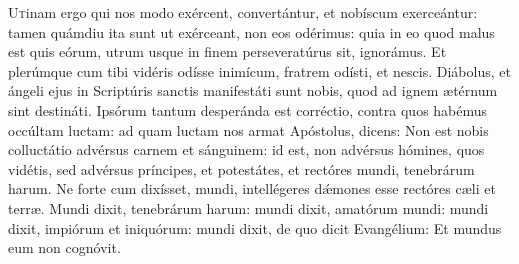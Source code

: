 
\lettrine{U}{t}inam ergo qui nos modo exércent, convertántur, et nobíscum exerceántur: tamen quámdiu ita sunt ut exérceant, non eos odérimus: quia in eo quod malus est quis eórum, utrum usque in finem perseveratúrus sit, ignorámus. Et plerúmque cum tibi vidéris odísse inimícum, fratrem odísti, et nescis. Diábolus, et ángeli ejus in Scriptúris sanctis manifestáti sunt nobis, quod ad ignem ætérnum sint destináti. Ipsórum tantum desperánda est corréctio, contra quos habémus occúltam luctam: ad quam luctam nos armat Apóstolus, dicens: Non est nobis colluctátio advérsus carnem et sánguinem: id est, non advérsus hómines, quos vidétis, sed advérsus príncipes, et potestátes, et rectóres mundi, tenebrárum harum. Ne forte cum dixísset, mundi, intellégeres dǽmones esse rectóres cæli et terræ. Mundi dixit, tenebrárum harum: mundi dixit, amatórum mundi: mundi dixit, impiórum et iniquórum: mundi dixit, de quo dicit Evangélium: Et mundus eum non cognóvit.